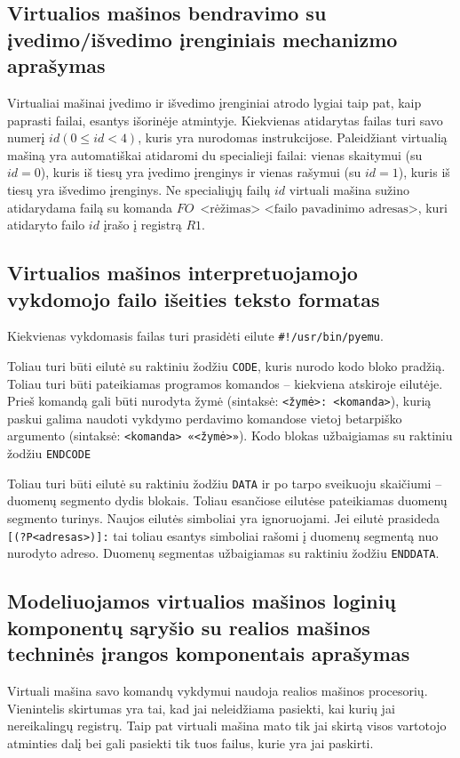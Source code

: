 \subsection{Virtualios mašinos bendravimo su įvedimo/išvedimo įrenginiais
mechanizmo aprašymas}

Virtualiai mašinai įvedimo ir išvedimo įrenginiai atrodo lygiai taip pat,
kaip paprasti failai, esantys išorinėje atmintyje. Kiekvienas atidarytas
failas turi savo numerį $id (0 \leq id < 4)$, kuris yra nurodomas 
instrukcijose. Paleidžiant virtualią mašiną yra automatiškai atidaromi
du specialieji failai: vienas skaitymui (su $id = 0$), kuris iš tiesų yra
įvedimo įrenginys ir vienas rašymui (su $id = 1$), kuris iš tiesų yra 
išvedimo įrenginys. Ne specialiųjų failų $id$ virtuali mašina sužino
atidarydama failą su komanda 
$FO\,\text{ <rėžimas> <failo pavadinimo adresas>}$,
kuri atidaryto failo $id$ įrašo į registrą $R1$.


\subsection{Virtualios mašinos interpretuojamojo vykdomojo failo išeities 
teksto formatas}

Kiekvienas vykdomasis failas turi prasidėti eilute
\verb|#!/usr/bin/pyemu|.

Toliau turi būti eilutė su raktiniu žodžiu \verb|CODE|, kuris nurodo
kodo bloko pradžią. Toliau turi būti pateikiamas programos komandos – 
kiekviena atskiroje eilutėje. Prieš komandą gali būti nurodyta žymė
(sintaksė: \verb|<žymė>: <komanda>|), kurią paskui galima naudoti vykdymo
perdavimo komandose vietoj betarpiško argumento (sintaksė: 
\verb|<komanda> «<žymė>»|). Kodo blokas užbaigiamas su raktiniu žodžiu
\verb|ENDCODE|

Toliau turi būti eilutė su raktiniu žodžiu \verb|DATA| ir po tarpo 
sveikuoju skaičiumi – duomenų segmento dydis blokais.
Toliau esančiose eilutėse pateikiamas duomenų segmento turinys. Naujos
eilutės simboliai yra ignoruojami. Jei eilutė prasideda 
\verb|[(?P<adresas>)]:| tai toliau esantys simboliai rašomi į duomenų
segmentą nuo nurodyto adreso. Duomenų segmentas užbaigiamas su 
raktiniu žodžiu \verb|ENDDATA|.

\subsection{Modeliuojamos virtualios mašinos loginių komponentų sąryšio su 
realios mašinos techninės įrangos komponentais aprašymas}

Virtuali mašina savo komandų vykdymui naudoja realios mašinos procesorių.
Vienintelis skirtumas yra tai, kad jai neleidžiama pasiekti, kai kurių
jai nereikalingų registrų. Taip pat virtuali mašina mato tik jai skirtą
visos vartotojo atminties dalį bei gali pasiekti tik tuos failus, kurie
yra jai paskirti.
   

